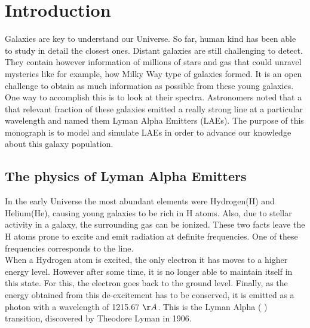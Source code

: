 \setcounter{equation}{0}
\chapter{Introduction}

Galaxies are key to understand our Universe. So far, human kind has been able to study in detail the closest ones. Distant galaxies are still challenging to detect. They contain however information of millions of stars and gas that could unravel mysteries like for example, how Milky Way type of galaxies formed. It is an open challenge to obtain as much information as possible from these young galaxies. One way to accomplish this is to look at their spectra. Astronomers noted that a that relevant fraction of these galaxies emitted a really strong line at a particular wavelength and named them Lyman Alpha Emitters (LAEs). The purpose of this monograph is to model and simulate LAEs in order to advance our knowledge about this galaxy population. \\



\section{The physics of Lyman Alpha Emitters}
\label{sec1:laes}
In the early Universe the most abundant elements were Hydrogen(H) and Helium(He), causing young galaxies to be rich in H atoms. Also, due to stellar activity in a galaxy, the surrounding gas can be ionized. These two facts leave the H atoms prone to excite and emit radiation at definite frequencies. One of these frequencies corresponds to the \lya line. \cite{PartridgePeebles}  \\

When a Hydrogen atom is excited, the only electron it has moves to a higher energy level. However after some time, it is no longer able to maintain itself in this state. For this, the electron goes back to the ground level. Finally, as the energy obtained from this de-excitement has to be conserved, it is emitted as a photon with a wavelength of 1215.67 $\AA$. This is the Lyman Alpha ( \lya) transition, discovered by Theodore Lyman in 1906. \cite{LymanBio} \\

